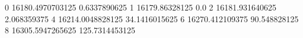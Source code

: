 0 16180.4970703125 0.6337890625
1 16179.86328125 0.0
2 16181.931640625 2.068359375
4 16214.0048828125 34.1416015625
6 16270.412109375 90.548828125
8 16305.5947265625 125.7314453125
